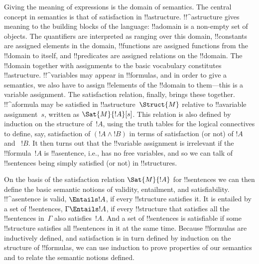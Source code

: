 




Giving the meaning of expressions is the domain of semantics.  The
central concept in semantics is that of satisfaction in
!!a{structure}. !!^a{structure} gives meaning to the building blocks
of the language: !!a{domain} is a non-empty set of objects. The
quantifiers are interpreted as ranging over this domain, !!{constant}s
are assigned elements in the domain, !!{function}s are assigned
functions from the !!{domain} to itself, and !!{predicate}s are
assigned relations on the !!{domain}.  The !!{domain} together with
assignments to the basic vocabulary constitutes !!a{structure}.
!!^{variable}s may appear in !!{formula}s, and in order to give a
semantics, we also have to assign !!{element}s of the !!{domain} to
them---this is a variable assignment. The satisfaction relation,
finally, brings these together. !!^a{formula} may be satisfied in
!!a{structure}~$\Struct{M}$ relative to !!a{variable} assignment~$s$,
written as $\Sat{M}{!A}[s]$. This relation is also defined by
induction on the structure of~$!A$, using the truth tables for the
logical connectives to define, say, satisfaction of $(!A \land !B)$ in
terms of satisfaction (or not) of $!A$ and ~$!B$.  It then turns out
that the !!{variable} assignment is irrelevant if the !!{formula}~$!A$
is !!a{sentence}, i.e., has no free variables, and so we can talk of
!!{sentence}s being simply satisfied (or not) in !!{structure}s.

On the basis of the satisfaction relation $\Sat{M}{!A}$ for !!{sentence}s
we can then define the basic semantic notions of validity, entailment,
and satisfiability. !!^a{sentence} is valid, $\Entails !A$, if every
!!{structure} satisfies it. It is entailed by a set of !!{sentence}s,
$\Gamma \Entails !A$, if every !!{structure} that satisfies all the
!!{sentence}s in~$\Gamma$ also satisfies~$!A$. And a set of !!{sentence}s
is satisfiable if some !!{structure} satisfies all !!{sentence}s in it
at the same time.  Because !!{formula}s are inductively defined, and
satisfaction is in turn defined by induction on the structure of
!!{formula}s, we can use induction to prove properties of our
semantics and to relate the semantic notions defined.






